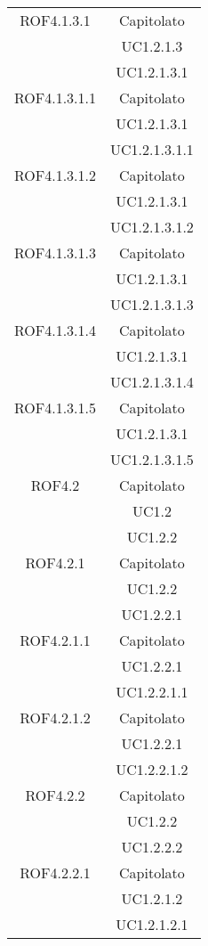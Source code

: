 \begin{longtable}{|c|c|}
\midrule
ROF4.1.3.1
& Capitolato\\
& UC1.2.1.3\\
& UC1.2.1.3.1\\

\midrule
ROF4.1.3.1.1
& Capitolato\\
& UC1.2.1.3.1\\
& UC1.2.1.3.1.1\\

\midrule
ROF4.1.3.1.2
& Capitolato\\
& UC1.2.1.3.1\\
& UC1.2.1.3.1.2\\

\midrule
ROF4.1.3.1.3
& Capitolato\\
& UC1.2.1.3.1\\
& UC1.2.1.3.1.3\\

\midrule
ROF4.1.3.1.4
& Capitolato\\
& UC1.2.1.3.1\\
& UC1.2.1.3.1.4\\

\midrule
ROF4.1.3.1.5
& Capitolato\\
& UC1.2.1.3.1\\
& UC1.2.1.3.1.5\\

\midrule
ROF4.2
& Capitolato\\
& UC1.2\\
& UC1.2.2\\

\midrule
ROF4.2.1
& Capitolato\\
& UC1.2.2\\
& UC1.2.2.1\\

\midrule
ROF4.2.1.1
& Capitolato\\
& UC1.2.2.1\\
& UC1.2.2.1.1\\

\midrule
ROF4.2.1.2
& Capitolato\\
& UC1.2.2.1\\
& UC1.2.2.1.2\\

\midrule
ROF4.2.2
& Capitolato\\
& UC1.2.2\\
& UC1.2.2.2\\

\midrule
ROF4.2.2.1
& Capitolato\\
& UC1.2.1.2\\
& UC1.2.1.2.1\\


\end{longtable}
